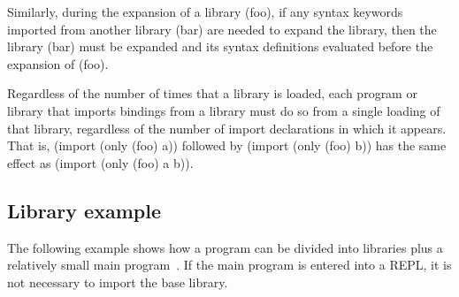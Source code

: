 Similarly, during the expansion of a library {\cf (foo)}, if any syntax
keywords imported from another library {\cf (bar)} are needed to expand
the library, then the library {\cf (bar)} must be expanded and its syntax
definitions evaluated before the expansion of {\cf (foo)}.

Regardless of the number of times that a library is loaded, each
program or library that imports bindings from a library must do so from a
single loading of that library, regardless of the number of import
declarations in which it appears.
That is, {\cf (import (only (foo) a))} followed by {\cf (import (only (foo) b))}
has the same effect as {\cf (import (only (foo) a b))}.

\subsection{Library example}
The following example shows
how a program can be divided into libraries plus a relatively small
main program~\cite{life}.
If the main program is entered into a REPL, it is not necessary to import
the base library.

